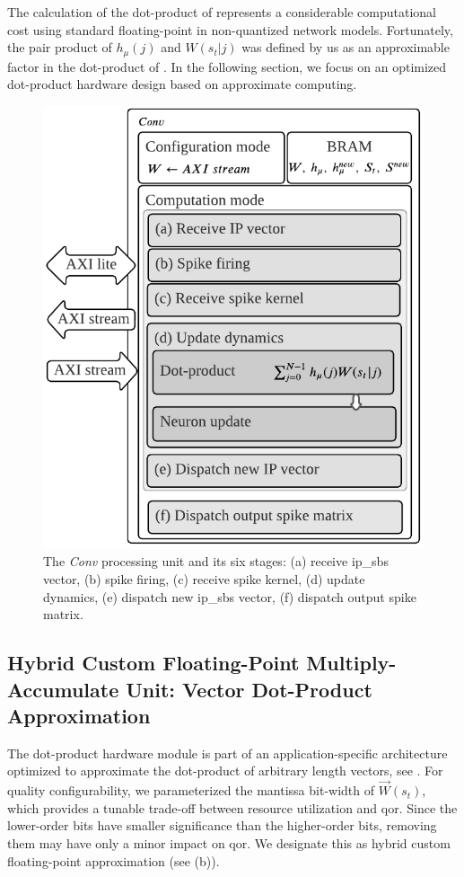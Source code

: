 The calculation of the dot-product of  represents a considerable computational cost using standard floating-point in non-quantized network models. Fortunately, the pair product of $h_{\mu}(j)$ and $W(s_t|j)$ was defined by us as an approximable factor in the dot-product of . In the following section, we focus on an optimized dot-product hardware design based on approximate computing.


\begin{figure}[b!]
	\centering
	\includegraphics[width=0.5\columnwidth]{./chapters/sbs_accelerator/figures/sbs_conv.pdf}
	\caption{The \emph{Conv} processing unit and its six stages: (a) receive \gls{ip_sbs} vector, (b) spike firing, (c) receive spike kernel, (d) update dynamics, (e) dispatch new \gls{ip_sbs} vector, (f) dispatch output spike matrix.}
	\label{fig:hw_conv}
\end{figure}

\subsection{Hybrid Custom Floating-Point Multiply-Accumulate Unit: Vector Dot-Product Approximation}
\label{sec:dot-product_hardware_module}
The dot-product hardware module is part of an application-specific architecture optimized to approximate the dot-product of arbitrary length vectors, see . For quality configurability, we parameterized the mantissa bit-width of $\vec{W}(s_t)$, which provides a tunable trade-off between resource utilization and \gls{qor}. Since the lower-order bits have smaller significance than the higher-order bits, removing them may have only a minor impact on \gls{qor}. We designate this as hybrid custom floating-point approximation (see {}(b)).

